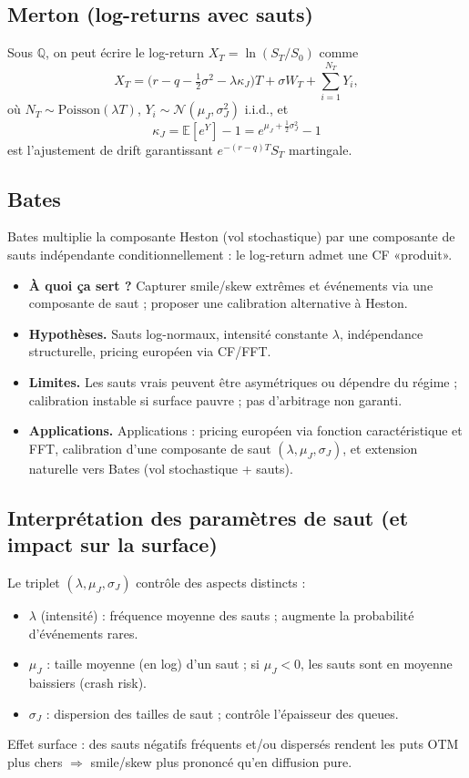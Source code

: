 \documentclass[11pt,a4paper]{report}
\theoremstyle{definition}
\theoremstyle{plain}
\theoremstyle{remark}
\newcommand{\E}{\mathbb{E}}
\newcommand{\1}{\mathbf{1}}
\newcommand{\Normal}{\mathcal{N}}
\newcommand{\Qmeas}{\mathbb{Q}}
\newcommand{\qa}[4]{
\begin{itemize}[leftmargin=*]
\item \textbf{À quoi ça sert ?} #1
\item \textbf{Hypothèses.} #2
\item \textbf{Limites.} #3
\item \textbf{Applications.} #4
\end{itemize}
}
\begin{document}
\subsection*{Merton (log-returns avec sauts)}
Sous $\Qmeas$, on peut écrire le log-return $X_T=\ln(S_T/S_0)$ comme
\[
X_T = \Big(r-q-\tfrac12\sigma^2-\lambda \kappa_J\Big)T + \sigma W_T + \sum_{i=1}^{N_T} Y_i,
\]
où $N_T\sim\text{Poisson}(\lambda T)$, $Y_i\sim \Normal(\mu_J,\sigma_J^2)$ i.i.d., et
\[
\kappa_J = \E[e^{Y}]-1 = e^{\mu_J+\tfrac12\sigma_J^2}-1
\]
est l'ajustement de drift garantissant $e^{-(r-q)T}S_T$ martingale.

\subsection*{Bates}
Bates multiplie la composante Heston (vol stochastique) par une composante de sauts indépendante conditionnellement : le log-return admet une CF «produit».

\qa
{Capturer smile/skew extrêmes et événements via une composante de saut ; proposer une calibration alternative à Heston.}
{Sauts log-normaux, intensité constante $\lambda$, indépendance structurelle, pricing européen via CF/FFT.}
{Les sauts vrais peuvent être asymétriques ou dépendre du régime ; calibration instable si surface pauvre ; pas d'arbitrage non garanti.}
{Applications : pricing européen via fonction caractéristique et FFT, calibration d'une composante de saut $(\lambda,\mu_J,\sigma_J)$, et extension naturelle vers Bates (vol stochastique + sauts).}

\subsection*{Interprétation des paramètres de saut (et impact sur la surface)}
Le triplet $(\lambda,\mu_J,\sigma_J)$ contrôle des aspects distincts :
\begin{itemize}[leftmargin=*]
\item $\lambda$ (intensité) : fréquence moyenne des sauts ; augmente la probabilité d'événements rares.
\item $\mu_J$ : taille moyenne (en log) d'un saut ; si $\mu_J<0$, les sauts sont en moyenne baissiers (crash risk).
\item $\sigma_J$ : dispersion des tailles de saut ; contrôle l'épaisseur des queues.
\end{itemize}
Effet surface : des sauts négatifs fréquents et/ou dispersés rendent les puts OTM plus chers $\Rightarrow$ smile/skew plus prononcé qu'en diffusion pure.
\end{document}
